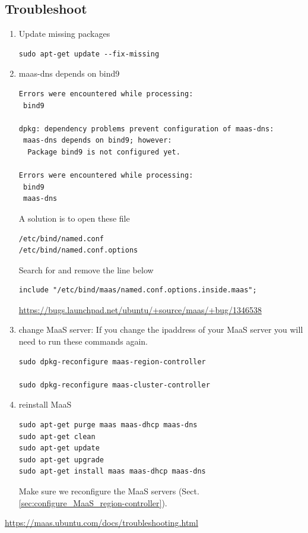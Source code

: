 \subsection{Troubleshoot}

\begin{enumerate}
  \item Update missing packages
\begin{verbatim}
sudo apt-get update --fix-missing
\end{verbatim}

  \item maas-dns depends on bind9
\begin{verbatim}
Errors were encountered while processing:
 bind9

dpkg: dependency problems prevent configuration of maas-dns:
 maas-dns depends on bind9; however:
  Package bind9 is not configured yet.

Errors were encountered while processing:
 bind9
 maas-dns
\end{verbatim}
A solution is to open these file 
\begin{verbatim}
/etc/bind/named.conf
/etc/bind/named.conf.options
\end{verbatim}
Search for and remove the line below
\begin{verbatim}
include "/etc/bind/maas/named.conf.options.inside.maas";
\end{verbatim} 
\url{https://bugs.launchpad.net/ubuntu/+source/maas/+bug/1346538}

  \item change MaaS server: If you change the ipaddress of your MaaS server you will need to run these
commands again.
\begin{verbatim}
sudo dpkg-reconfigure maas-region-controller

sudo dpkg-reconfigure maas-cluster-controller 
\end{verbatim}


  \item reinstall MaaS
\begin{verbatim}
sudo apt-get purge maas maas-dhcp maas-dns
sudo apt-get clean
sudo apt-get update
sudo apt-get upgrade
sudo apt-get install maas maas-dhcp maas-dns
\end{verbatim}
Make sure we reconfigure the MaaS servers
(Sect.\ref{sec:configure_MaaS_region-controller}).

\end{enumerate}


\url{https://maas.ubuntu.com/docs/troubleshooting.html}


